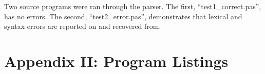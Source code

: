 \documentclass[paper=letter, fontsize=11pt, oneside, titlepage]{scrartcl}
\newcommand{\scalalisting}[2][]{
    
}
\newcommand{\datalisting}[2][]{
    
}
\newcommand{\filelisting}[2][]{
    
}
\begin{document}
Two source programs were ran through the parser. The first, ``test1\_correct.pas'', has no errors.  The second, ``test2\_error.pas'', demonstrates that lexical and syntax errors are reported on and recovered from.  

\filelisting[language=pascal]{test1_correct.pas}
\filelisting{test1_correct.pas.listing}
\filelisting{test1_correct.pas.tokens}
\filelisting[language=pascal]{test2_errors.pas}
\filelisting{test2_errors.pas.listing}
\filelisting{test2_errors.pas.tokens}

\section{Appendix II: Program Listings}\label{code}


\scalalisting{net/michaelripley/pascalcompiler/parser/Parser.scala}
\end{document}
